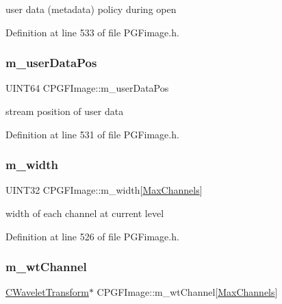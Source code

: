 user data (metadata) policy during open 



Definition at line 533 of file P\+G\+Fimage.\+h.

\mbox{\label{classCPGFImage_acf4ae6e169ddf84e32cf9b57a22800b3}} 
\subsubsection{\texorpdfstring{m\_userDataPos}{m\_userDataPos}}
{\footnotesize\ttfamily U\+I\+N\+T64 C\+P\+G\+F\+Image\+::m\+\_\+user\+Data\+Pos\hspace{0.3cm}{\ttfamily [protected]}}



stream position of user data 



Definition at line 531 of file P\+G\+Fimage.\+h.

\mbox{\label{classCPGFImage_ab6d97aca28795fae697fdda4b8acd8f9}} 
\subsubsection{\texorpdfstring{m\_width}{m\_width}}
{\footnotesize\ttfamily U\+I\+N\+T32 C\+P\+G\+F\+Image\+::m\+\_\+width\mbox{[}\mbox{\hyperlink{PGFtypes_8h_a94219182f88d4dbed1021ed04db75e41}{Max\+Channels}}\mbox{]}\hspace{0.3cm}{\ttfamily [protected]}}



width of each channel at current level 



Definition at line 526 of file P\+G\+Fimage.\+h.

\mbox{\label{classCPGFImage_ae3901a689b7d1dd46d48b042c3d31d5c}} 
\subsubsection{\texorpdfstring{m\_wtChannel}{m\_wtChannel}}
{\footnotesize\ttfamily \mbox{\hyperlink{classCWaveletTransform}{C\+Wavelet\+Transform}}$\ast$ C\+P\+G\+F\+Image\+::m\+\_\+wt\+Channel\mbox{[}\mbox{\hyperlink{PGFtypes_8h_a94219182f88d4dbed1021ed04db75e41}{Max\+Channels}}\mbox{]}\hspace{0.3cm}{\ttfamily [protected]}}



